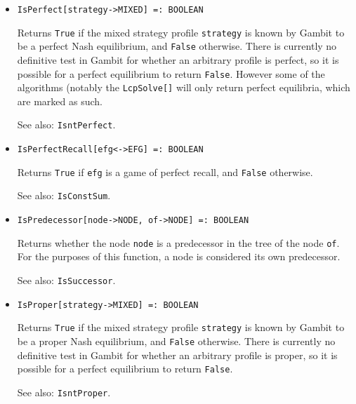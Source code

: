 \begin{itemize}
\item
\protect \large \begin{verbatim}
IsPerfect[strategy->MIXED] =: BOOLEAN
\end{verbatim}\normalsize

\bd 
Returns \verb+True+ if the mixed strategy profile \verb+strategy+
is known by Gambit to be a perfect Nash equilibrium, and \verb+False+
otherwise.  There is currently no definitive test in Gambit for
whether an arbitrary profile is perfect, so it is possible for a
perfect equilibrium to return \verb+False+.  However some of the
algorithms (notably the \verb+LcpSolve[]+ will only return perfect
equilibria, which are marked as such.  
\item
[See also:] {\tt IsntPerfect}.
\ed

\item
\protect \large \begin{verbatim}
IsPerfectRecall[efg<->EFG] =: BOOLEAN
\end{verbatim}\normalsize

\bd 
Returns \verb+True+ if \verb+efg+ is a game of perfect recall, and
\verb+False+ otherwise.  
\item
[See also:] {\tt IsConstSum}.
\ed



\item
\protect \large \begin{verbatim}
IsPredecessor[node->NODE, of->NODE] =: BOOLEAN
\end{verbatim}\normalsize

\bd
Returns whether the node \verb+node+ is a predecessor
in the tree of the node \verb+of+.  For the purposes of this function,
a node is considered its own predecessor.
\item
[See also:] {\tt IsSuccessor}.
\ed

\item
\protect \large \begin{verbatim}
IsProper[strategy->MIXED] =: BOOLEAN
\end{verbatim}\normalsize

\bd Returns \verb+True+ if the mixed strategy profile \verb+strategy+
is known by Gambit to be a proper Nash equilibrium, and \verb+False+
otherwise.  There is currently no definitive test in Gambit for
whether an arbitrary profile is proper, so it is possible for a
perfect equilibrium to return \verb+False+.  
\item
[See also:] {\tt IsntProper}.
\ed


\end{itemize}

